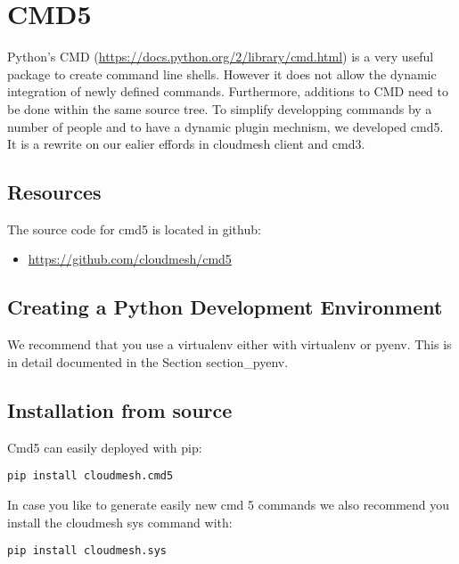 \FILENAME

\section{CMD5}\label{cmd5}

Python's CMD (\url{https://docs.python.org/2/library/cmd.html}) is a
very useful package to create command line shells. However it does not
allow the dynamic integration of newly defined commands. Furthermore,
additions to CMD need to be done within the same source tree. To
simplify developping commands by a number of people and to have a
dynamic plugin mechnism, we developed cmd5. It is a rewrite on our
ealier effords in cloudmesh client and cmd3.

\subsection{Resources}\label{resources}

The source code for cmd5 is located in github:

\begin{itemize}
\tightlist
\item
  \url{https://github.com/cloudmesh/cmd5}
\end{itemize}

\subsection{Creating a Python Development
Environment}\label{creating-a-python-development-environment}

We recommend that you use a virtualenv either with virtualenv or pyenv.
This is in detail documented in the Section section\_pyenv.

\subsection{Installation from source}\label{installation-from-source}

Cmd5 can easily deployed with pip:

\begin{verbatim}
pip install cloudmesh.cmd5
\end{verbatim}

In case you like to generate easily new cmd 5 commands we also recommend
you install the cloudmesh sys command with:

\begin{verbatim}
pip install cloudmesh.sys
\end{verbatim}

